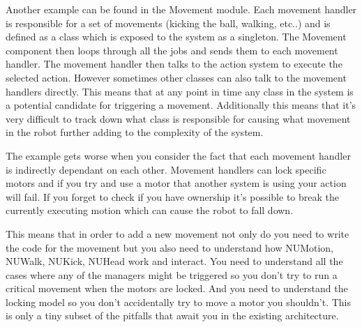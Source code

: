 \documentclass[english,12pt]{scrartcl}
\begin{document}
            Another example can be found in the Movement module.
            Each movement handler is responsible for a set of movements (kicking the ball, walking,
            etc..) and is defined as a class which is exposed to the system as a singleton. The
            Movement component then loops through all the jobs and sends them to each movement
            handler. The movement handler then talks to the action system to execute the selected
            action. However sometimes other classes can also talk to the movement handlers directly. 
            This means that at any point in time any class in the system is a potential candidate
            for triggering a movement. Additionally this means that it's very difficult to track
            down what class is responsible for causing what movement in the robot further adding to
            the complexity of the system.

            The example gets worse when you consider the fact that each movement handler is
            indirectly dependant on each other. Movement handlers can lock specific motors and if
            you try and use a motor that another system is using your action will fail. If you
            forget to check if you have ownership it's possible to break the currently executing
            motion which can cause the robot to fall down.
            
            This means that in order to add a new movement not only do you need to write the code for the movement
            but you also need to understand how NUMotion, NUWalk, NUKick, NUHead work and interact.
            You need to understand all the cases where any of the managers might be triggered so you
            don't try to run a critical movement when the motors are locked. And you need to
            understand the locking model so you don't accidentally try to move a motor you
            shouldn't. This is only a tiny subset of the pitfalls that await you in the existing
            architecture.

            
\end{document}
